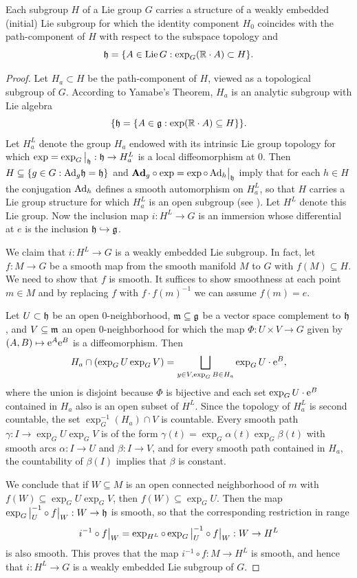 \begin{thm}\label{thm initial subgroup}
    Each subgroup $H$ of a Lie group $G$ carries a structure of a weakly embedded (initial) Lie subgroup for which the identity component $H_0$ coincides with the path-component of $H$ with respect to the subspace topology and
    \[\mathfrak{h}=\{A\in\operatorname{Lie} G: \exp_G(\mathbb{R}\cdot A)\subset H\}.\]
\end{thm}
\begin{proof}
    Let $H_a\subset H$ be the path-component of $H$, viewed as a topological subgroup of $G$. According to Yamabe's Theorem, $H_a$ is an analytic subgroup with Lie algebra
    \[\{\mathfrak{h}=\{A\in\mathfrak{g}:\exp(\mathbb{R}\cdot A)\subseteq H\}\}.\]
    Let $H_a^L$ denote the group $H_a$ endowed with its intrinsic Lie group topology for which $\exp=\restr{\exp_G}{\frakh}:\frakh\to H_a^L$ is a local diffeomorphism at $0$. Then $H\subseteq\{g\in G:\mathrm{Ad}_g\mathfrak{h}=\mathfrak{h}\}$ and $\Adg_g\circ \exp=\exp\circ\restr{\Ad_h}{\frakh}$ imply that for each $h\in H$ the conjugation $\mathrm{Ad}_h$ defines a smooth automorphism on $H_a^L$, so that $H$ carries a Lie group structure for which $H_a^L$ is an open subgroup (see \cite[Thm.~9.4.4, Cor.~9.4.5]{HN}). Let $H^L$ denote this Lie group. Now the inclusion map $i:H^L\to G$ is an immersion whose differential at $e$ is the inclusion $\mathfrak{h}\hookrightarrow\mathfrak{g}$.

    We claim that $i:H^L\to G$ is a weakly embedded Lie subgroup. In fact, let $f:M\to G$ be a smooth map from the smooth manifold $M$ to $G$ with $f(M)\subseteq H$. We need to show that $f$ is smooth. It suffices to show smoothness at each point $m\in M$ and by replacing $f$ with $f\cdot f(m)^{-1}$ we can assume $f(m)=e$.

    Let $U\subset \mathfrak{h}$ be an open 0-neighborhood, $\mathfrak{m}\subseteq\mathfrak{g}$ be a vector space complement to $\mathfrak{h}$, and $V\subseteq \mathfrak{m}$ an open 0-neighborhood for which the map $\Phi:U\times V\to G$ given by $(A,B)\mapsto \mathrm{e}^A\mathrm{e}^B$ is a diffeomorphism. Then 
    \[H_a\cap(\exp_G U\exp_G V)=\bigsqcup_{y\in V,\exp_G B\in H_a}\exp_GU \cdot \mathrm{e}^B,\]
    where the union is disjoint because $\Phi$ is bijective and each set $\exp_GU\cdot \mathrm{e}^B$ contained in $H_a$ also is an open subset of $H^L$. Since the topology of $H^L_a$ is second countable, the set $\exp^{-1}_G(H_a)\cap V$ is countable. Every smooth path $\gamma:I\to \exp_GU\exp_GV$ is of the form $\gamma(t)=\exp_G\alpha(t)\exp_G\beta(t)$ with smooth arcs $\alpha:I\to U$ and $\beta:I\to V$, and for every smooth path contained in $H_a$, the countability of $\beta(I)$ implies that $\beta$ is constant.

    We conclude that if $W\subseteq M$ is an open connected neighborhood of $m$ with $f(W)\subseteq \exp_GU\exp_GV$, then $f(W)\subseteq \exp_GU$. Then the map $\restr{\exp_G}{U}^{-1}\circ \restr{f}{W}:W\to\frakh$ is smooth, so that the corresponding restriction in range
    \[i^{-1}\circ \restr{f}{W}=\exp_{H^L}\circ \restr{\exp_G}{U}^{-1}\circ \restr{f}{W}:W\to H^L\]
    is also smooth. This proves that the map $i^{-1}\circ f:M\to H^L$ is smooth, and hence that $i:H^L\to G$ is a weakly embedded Lie subgroup of $G$.
\end{proof}


